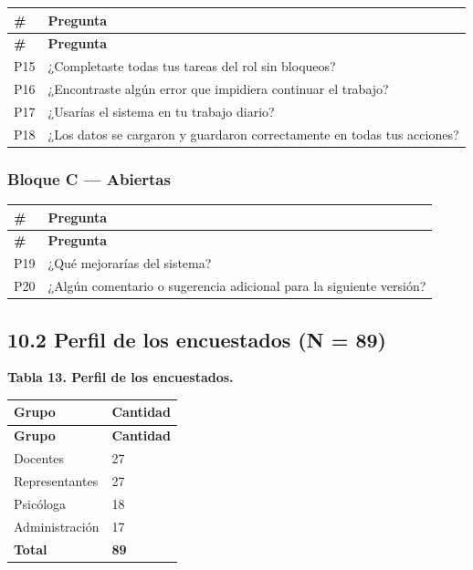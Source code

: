 \documentclass[11pt,a4paper]{article}
\begin{document}
{\small
\begin{longtable}{|p{}|p{}|}
\rowcolor{UTECblue}\color{white}\bfseries \# & \color{white}\bfseries Pregunta \\ \hline
\endfirsthead
\rowcolor{UTECblue}\color{white}\bfseries \# & \color{white}\bfseries Pregunta \\ \hline
\endhead
P15 & ¿Completaste todas tus tareas del rol sin bloqueos? \\ \hline
P16 & ¿Encontraste algún error que impidiera continuar el trabajo? \\ \hline
P17 & ¿Usarías el sistema en tu trabajo diario? \\ \hline
P18 & ¿Los datos se cargaron y guardaron correctamente en todas tus acciones? \\ \hline
\end{longtable}}


\subsubsection*{Bloque C --- Abiertas}


{\small
\begin{longtable}{|p{}|p{}|}
\rowcolor{UTECblue}\color{white}\bfseries \# & \color{white}\bfseries Pregunta \\ \hline
\endfirsthead
\rowcolor{UTECblue}\color{white}\bfseries \# & \color{white}\bfseries Pregunta \\ \hline
\endhead
P19 & ¿Qué mejorarías del sistema? \\ \hline
P20 & ¿Algún comentario o sugerencia adicional para la siguiente versión? \\ \hline
\end{longtable}}


\subsection*{10.2 Perfil de los encuestados (N = 89)}


\textbf{Tabla 13. Perfil de los encuestados.}


{\small
\begin{longtable}{|p{}|p{}|}
\rowcolor{UTECblue}\color{white}\bfseries Grupo & \color{white}\bfseries Cantidad \\ \hline
\endfirsthead
\rowcolor{UTECblue}\color{white}\bfseries Grupo & \color{white}\bfseries Cantidad \\ \hline
\endhead
Docentes & 27 \\ \hline
Representantes & 27 \\ \hline
Psicóloga & 18 \\ \hline
Administración & 17 \\ \hline
\textbf{Total} & \textbf{89} \\ \hline
\end{longtable}}
\end{document}
